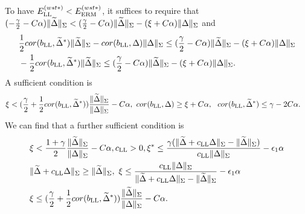 To have $E_{\textup{LL}}^{(wst*)}< E_{\textup{ERM}}^{(wst*)}$, it suffices to require that $(-\frac{\gamma}{2}-C\alpha)\|\widetilde{\Delta}\|_{\Sigma}< (\frac{\gamma}{2}-C\alpha)\|\widetilde{\Delta}\|_{\Sigma}-(\xi+C\alpha)\|\Delta\|_{\Sigma}$ and
\begin{align*}
   &\frac{1}{2} cor(b_{\textup{LL}},\widetilde{\Delta}^*)\|\widetilde{\Delta}\|_{\Sigma}-cor(b_{\textup{LL}},\Delta)\|\Delta\|_{\Sigma}\leq (\frac{\gamma}{2}-C\alpha)\|\widetilde{\Delta}\|_{\Sigma}-(\xi+C\alpha)\|\Delta\|_{\Sigma}\\
   &-\frac{1}{2} cor(b_{\textup{LL}},\widetilde{\Delta}^*)\|\widetilde{\Delta}\|_{\Sigma}\leq (\frac{\gamma}{2}-C\alpha)\|\widetilde{\Delta}\|_{\Sigma}-(\xi+C\alpha)\|\Delta\|_{\Sigma}.
\end{align*}
A sufficient condition is
\begin{align*}
    & \xi < (\frac{\gamma}{2}+\frac{1}{2}cor(b_{\textup{LL}},\widetilde{\Delta}^*))\frac{\|\widetilde{\Delta}\|_{\Sigma}}{\|\Delta\|_{\Sigma}}-C\alpha,~cor(b_{\textup{LL}},\Delta)\geq \xi+C\alpha,~~cor(b_{\textup{LL}},\widetilde{\Delta}^*)\leq \gamma-2C\alpha.
\end{align*}
We can find that a further sufficient condition is
\begin{align}
   & \xi < \frac{1+\gamma}{2}\frac{\|\widetilde{\Delta}\|_{\Sigma}}{\|\Delta\|_{\Sigma}}-C\alpha, c_{\textup{LL}}> 0, \xi^*\leq \frac{\gamma(\|\widetilde{\Delta}+c_{\textup{LL}}\Delta\|_{\Sigma}-\|\widetilde{\Delta}\|_{\Sigma})}{c_{\textup{LL}}\|\Delta\|_{\Sigma}}-\epsilon_1\alpha\label{cond1-da}\\
    &\|\widetilde{\Delta}+c_{\textup{LL}}\Delta\|_{\Sigma}\geq \|\widetilde{\Delta}\|_{\Sigma},~\xi\leq \frac{c_{\textup{LL}}\|\Delta\|_{\Sigma}}{\|\widetilde{\Delta}+c_{\textup{LL}}\Delta\|_{\Sigma}-\|\widetilde{\Delta}\|_{\Sigma}}-\epsilon_1\alpha\label{cond2-da}\\
   & \xi \leq (\frac{\gamma}{2}+\frac{1}{2}cor(b_{\textup{LL}},\widetilde{\Delta}^*))\frac{\|\widetilde{\Delta}\|_{\Sigma}}{\|\Delta\|_{\Sigma}}-C\alpha.\label{cond3-da}
\end{align}

